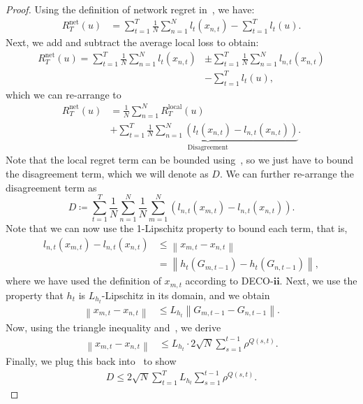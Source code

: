 \documentclass[journal]{IEEEtran} %
\newcommand{\br}[1]{\left(#1\right)}
\newcommand{\norm}[1]{\left\lVert{#1}\right\rVert}
\newcommand{\algname}{{DECO}\xspace}
\begin{document}
\begin{proof}
    Using the definition of network regret in~, we have:
    \begin{align}
        R_T^{\text{net}}(u) & = \sum_{t=1}^{T} \frac{1}{N} \sum_{n=1}^{N} l_{t}(x_{n,t}) - \sum_{t=1}^{T} l_{t}(u).
    \end{align}
    Next, we add and subtract the average local loss to obtain:
    \begin{align*}
        R_T^{\text{net}}(u) = \sum_{t=1}^{T} \frac{1}{N} \sum_{n=1}^{N} l_{t}(x_{n,t}) & \pm \sum_{t=1}^{T} \frac{1}{N} \sum_{n=1}^{N} l_{n,t}(x_{n,t}) \\
                                                                                       & - \sum_{t=1}^{T} l_{t}(u),
    \end{align*}
    which we can re-arrange to
    \begin{align*}
        R_T^{\text{net}}(u) & = \frac{1}{N} \sum_{n=1}^{N} R_T^{\text{local}}(u)                                                                     \\
                            & + \underbrace{\sum_{t=1}^{T} \frac{1}{N} \sum_{n=1}^{N} \br{l_{t}(x_{n,t}) - l_{n,t}(x_{n,t})}}_{\text{Disagreement}}.
    \end{align*}
    Note that the local regret term can be bounded using~, so we just have to bound the disagreement term, which we will denote as $D$.
    We can further re-arrange the disagreement term as
    \begin{equation}\label{eq:disagreement}
        D \coloneqq \sum_{t=1}^{T} \frac{1}{N} \sum_{n=1}^{N} \frac{1}{N} \sum_{m=1}^{N} \br{l_{n,t}(x_{m,t}) - l_{n,t}(x_{n,t})}.
    \end{equation}
    Note that we can now use the 1-Lipschitz property to bound each term, that is,
    \begin{align*}
        l_{n,t}(x_{m,t}) - l_{n,t}(x_{n,t}) & \leq \norm{x_{m,t} - x_{n,t}}             \\
                                            & = \norm{h_t(G_{m,t-1}) - h_t(G_{n,t-1})},
    \end{align*}
    where we have used the definition of $x_{m,t}$ according to \algname{}-$\pmb{ii}$.
    Next, we use the property that $h_t$ is $L_{h_t}$-Lipschitz in its domain, and we obtain
    \begin{align}
        \norm{x_{m,t} - x_{n,t}} & \leq L_{h_t} \norm{G_{m,t-1} - G_{n,t-1}}.
    \end{align}
    Now, using the triangle inequality and~, we derive
    \begin{align}
        \norm{x_{m,t} - x_{n,t}} & \leq L_{h_t} \cdot 2\sqrt{N} \sum_{s=1}^{t-1} \rho^{Q(s,t)}.
    \end{align}
    Finally, we plug this back into~ to show
    \begin{align}
        D \leq  2\sqrt{N} \sum_{t=1}^T L_{h_t} \sum_{s=1}^{t-1} \rho^{Q(s,t)}.
    \end{align}
\end{proof}
\end{document}

